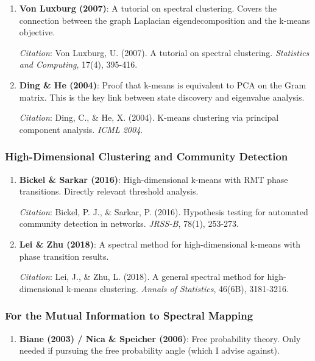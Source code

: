 \documentclass[
  12pt,
]{article}
\providecommand{\tightlist}{%
  \setlength{\itemsep}{0pt}\setlength{\parskip}{0pt}}
\begin{document}
\begin{enumerate}
\def\labelenumi{\arabic{enumi}.}
\setcounter{enumi}{5}
\item
  \textbf{Von Luxburg (2007)}: A tutorial on spectral clustering. Covers
  the connection between the graph Laplacian eigendecomposition and the
  k-means objective.

  \emph{Citation}: Von Luxburg, U. (2007). A tutorial on spectral
  clustering. \emph{Statistics and Computing}, 17(4), 395-416.
\item
  \textbf{Ding \& He (2004)}: Proof that k-means is equivalent to PCA on
  the Gram matrix. This is the key link between state discovery and
  eigenvalue analysis.

  \emph{Citation}: Ding, C., \& He, X. (2004). K-means clustering via
  principal component analysis. \emph{ICML 2004}.
\end{enumerate}

\subsubsection{High-Dimensional Clustering and Community
Detection}\label{high-dimensional-clustering-and-community-detection}

\begin{enumerate}
\def\labelenumi{\arabic{enumi}.}
\setcounter{enumi}{7}
\item
  \textbf{Bickel \& Sarkar (2016)}: High-dimensional k-means with RMT
  phase transitions. Directly relevant threshold analysis.

  \emph{Citation}: Bickel, P. J., \& Sarkar, P. (2016). Hypothesis
  testing for automated community detection in networks. \emph{JRSS-B},
  78(1), 253-273.
\item
  \textbf{Lei \& Zhu (2018)}: A spectral method for high-dimensional
  k-means with phase transition results.

  \emph{Citation}: Lei, J., \& Zhu, L. (2018). A general spectral method
  for high-dimensional k-means clustering. \emph{Annals of Statistics},
  46(6B), 3181-3216.
\end{enumerate}

\subsubsection{For the Mutual Information to Spectral
Mapping}\label{for-the-mutual-information-to-spectral-mapping}

\begin{enumerate}
\def\labelenumi{\arabic{enumi}.}
\setcounter{enumi}{9}
\tightlist
\item
  \textbf{Biane (2003) / Nica \& Speicher (2006)}: Free probability
  theory. Only needed if pursuing the free probability angle (which I
  advise against).
\end{enumerate}
\end{document}
